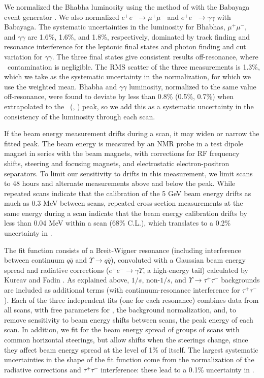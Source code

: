 \documentclass[aps,prl,twocolumn,superscriptaddress,showpacs]{revtex4}
\begin{document}
We normalized the Bhabha luminosity using the method of \cite{oldlumi}
with the {\textsc Babayaga} event generator \cite{babayaga}.  We also
normalized $e^+e^- \to \mu^+\mu^-$ and $e^+e^- \to \gamma\gamma$ with
{\textsc Babayaga}.  The systematic uncertainties in the luminosity
for Bhabhas, $\mu^+\mu^-$, and $\gamma\gamma$ are 1.6\%, 1.6\%, and
1.8\%, respectively, dominated by track finding and resonance
interference for the leptonic final states and photon finding and cut
variation for $\gamma\gamma$.  The three final states give consistent
results off-resonance, where \ups\ contamination is negligible.  The
RMS scatter of the three measurements is 1.3\%, which we take as the
systematic uncertainty in the normalization, for which we use the
weighted mean.  Bhabha and $\gamma\gamma$ luminosity, normalized to
the same value off-resonance, were found to deviate by less than 0.8\%
(0.5\%, 0.7\%) when extrapolated to the \us\ (\uss, \usss) peak, so we
add this as a systematic uncertainty in the consistency of the
luminosity through each scan.

If the beam energy measurement drifts during a scan, it may widen or
narrow the fitted peak.  The beam energy is measured by an NMR probe
in a test dipole magnet in series with the beam magnets, with
corrections for RF frequency shifts, steering and focusing magnets,
and electrostatic electron-positron separators.  To limit our
sensitivity to drifts in this measurement, we limit scans to 48 hours
and alternate measurements above and below the peak.  While repeated
scans indicate that the calibration of the 5 GeV beam energy drifts as
much as 0.3 MeV between scans, repeated cross-section measurements at
the same energy during a scan indicate that the beam energy
calibration drifts by less than 0.04 MeV within a scan (68\% C.L.),
which translates to a 0.2\% uncertainty in \gee.

The fit function consists of a Breit-Wigner resonance (including
interference between continuum $q\bar{q}$ and $\Upsilon \to
q\bar{q}$), convoluted with a Gaussian beam energy spread and
radiative corrections ($e^+e^- \to \gamma \Upsilon$, a high-energy
tail) calculated by Kureav and Fadin \cite{kf}.  As explained above,
$1/s$, non-$1/s$, and $\Upsilon \to \tau^+\tau^-$ backgrounds are
included as additional terms (with continuum-resonance interference
for $\tau^+\tau^-$).  Each of the three independent fits (one for each
resonance) combines data from all scans, with free parameters for
\gee, the background normalization, and, to remove sensitivity to beam
energy shifts between scans, the peak energy of each scan.  In
addition, we fit for the beam energy spread of groups of scans with
common horizontal steerings, but allow shifts when the steerings
change, since they affect beam energy spread at the level of 1\% of
itself.  The largest systematic uncertainties in the shape of the fit
function come from the normalization of the radiative corrections and
$\tau^+\tau^-$ interference: these lead to a 0.1\% uncertainty in
\gee.
\end{document}
